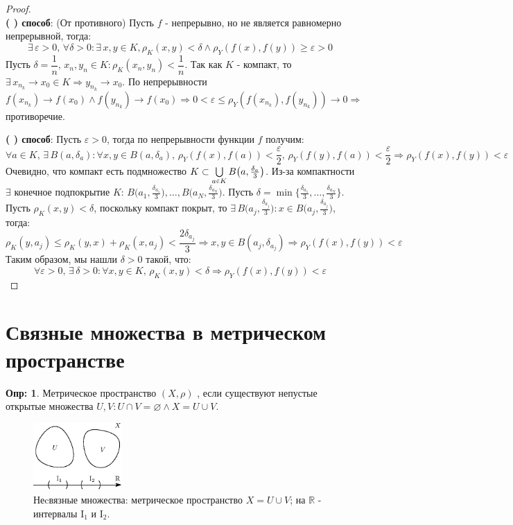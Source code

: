 \documentclass[12pt]{article}
\newcommand{\RN}[1]{%
	\textup{\uppercase\expandafter{\romannumeral#1}}%
}
\newcommand{\MR}{\mathbb{R}}
\newcommand{\VN}{\varnothing}
\newcommand{\VE}{\varepsilon}
\theoremstyle{definition}
\newtheorem{defn}{Опр:}
\newcommand{\smallerrel}[1]{\mathrel{\mathpalette\smallerrelaux{#1}}}
\newcommand{\smallerrelaux}[2]{\raisebox{.1ex}{\scalebox{.75}{$#1#2$}}}
\newcommand{\smallin}{\smallerrel{\in}}
\begin{document}
\begin{proof}\hfill\\
	\textbf{(\RN{1}) способ}: (От противного) Пусть $f$ - непрерывно, но не является равномерно непрерывной, тогда:
	$$
		\exists \, \VE > 0, \, \forall \delta > 0 \colon \exists \, x,y \in K, \rho_K(x,y) < \delta  \wedge \rho_Y(f(x),f(y)) \geq \VE > 0
	$$
	Пусть $\delta = \dfrac{1}{n}, \, x_n, y_n \in K \colon \rho_K(x_n,y_n) < \dfrac{1}{n}$. Так как $K$ - компакт, то $\exists \, x_{n_k} \to x_0 \in K \Rightarrow y_{n_k} \to x_0$. По непрерывности $f(x_{n_k}) \to f(x_0) \wedge f(y_{n_k}) \to f(x_0) \Rightarrow 0 < \VE \leq \rho_Y(f(x_{n_k}),f(y_{n_k})) \to 0 \Rightarrow$ противоречие.
	
	\textbf{(\RN{2}) способ}: Пусть $\VE >0$, тогда по непрерывности функции $f$ получим:
	$$
		\forall a \in K, \, \exists \, B(a,\delta_a) \colon \forall x,y \in B(a,\delta_a), \, \rho_Y(f(x),f(a)) < \frac{\VE}{2},\, \rho_Y(f(y),f(a)) < \frac{\VE}{2} \Rightarrow \rho_Y(f(x),f(y)) < \VE
	$$
	Очевидно, что компакт есть подмножество $K \subset \textstyle \bigcup\limits_{a \smallin K}B\big(a,\tfrac{\delta_a}{3}\big)$. Из-за компактности $\exists$ конечное подпокрытие $K$: $B\big(a_1,\tfrac{\delta_{a_1}}{3}\big), \dotsc, B\big(a_N,\tfrac{\delta_{a_N}}{3}\big)$. Пусть $\delta = \min\{\tfrac{\delta_{a_1}}{3}, \dotsc, \tfrac{\delta_{a_N}}{3}\}$. Пусть $\rho_K(x,y) < \delta$, поскольку компакт покрыт, то $\exists \, B\big(a_j,\tfrac{\delta_{a_j}}{3}\big) \colon x \in B\big(a_j,\tfrac{\delta_{a_j}}{3}\big)$, тогда:
	$$
		\rho_K(y,a_j) \leq \rho_K(y,x)  + \rho_K(x,a_j) < \dfrac{2\delta_{a_j}}{3} \Rightarrow x,y \in B(a_j, \delta_{a_j}) \Rightarrow \rho_Y(f(x),f(y)) < \VE
	$$
	Таким образом, мы нашли $\delta > 0$ такой, что:
	$$
		\forall \VE > 0, \, \exists \, \delta > 0 \colon \forall x,y \in K, \, \rho_K(x,y) < \delta \Rightarrow \rho_Y(f(x),f(y)) < \VE 
	$$
\end{proof}


\newpage
\section*{Связные множества в метрическом пространстве}
\begin{defn}
	Метрическое пространство $(X,\rho)$ , если существуют непустые открытые множества $U,V \colon U \cap V = \VN \wedge X = U \cup V$.
\end{defn}

\begin{figure}[H]
	\centering
	\includegraphics[width=0.3\textwidth]{10_5.eps}
	\caption{Неcвязные множества: метрическое пространство $X = U \cup V$; на $\MR$ - интервалы $\mathrm{I}_1$ и  $\mathrm{I}_2$.}
	\label{10_5}
\end{figure}
\end{document}

